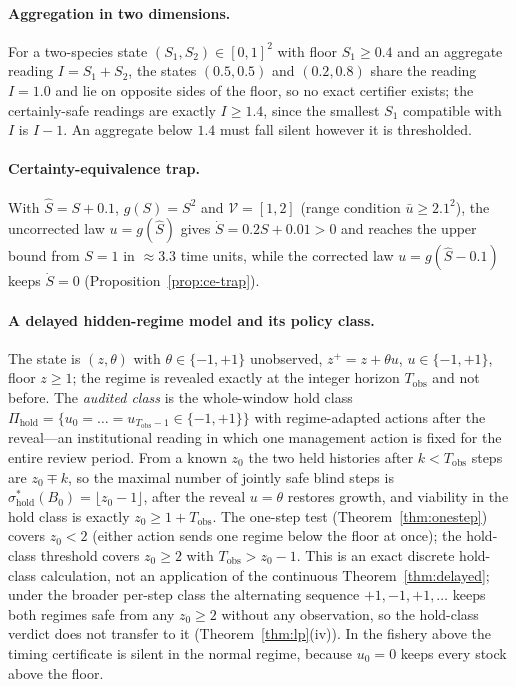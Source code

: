 \documentclass[11pt,a4paper]{article}
\theoremstyle{plain}
\theoremstyle{definition}
\theoremstyle{remark}
\newcommand{\cV}{\mathcal{V}}
\newcommand{\Tobs}{T_{\mathrm{obs}}}
\begin{document}
\paragraph{Aggregation in two dimensions.} For a two-species state $(S_1,S_2)\in[0,1]^2$ with floor $S_1\ge0.4$ and an aggregate reading $I=S_1+S_2$, the states $(0.5,0.5)$ and $(0.2,0.8)$ share the reading $I=1.0$ and lie on opposite sides of the floor, so no exact certifier exists; the certainly-safe readings are exactly $I\ge1.4$, since the smallest $S_1$ compatible with $I$ is $I-1$. An aggregate below $1.4$ must fall silent however it is thresholded.

\paragraph{Certainty-equivalence trap.} With $\hat S=S+0.1$, $g(S)=S^2$ and $\cV=[1,2]$ (range condition $\bar u\ge2.1^2$), the uncorrected law $u=g(\hat S)$ gives $\dot S=0.2S+0.01>0$ and reaches the upper bound from $S=1$ in $\approx3.3$ time units, while the corrected law $u=g(\hat S-0.1)$ keeps $\dot S=0$ (Proposition~\ref{prop:ce-trap}).

\paragraph{A delayed hidden-regime model and its policy class.} The state is $(z,\theta)$ with $\theta\in\{-1,+1\}$ unobserved, $z^+=z+\theta u$, $u\in\{-1,+1\}$, floor $z\ge1$; the regime is revealed exactly at the integer horizon $\Tobs$ and not before. The \emph{audited class} is the whole-window hold class $\Pi_{\mathrm{hold}}=\{u_0=\dots=u_{\Tobs-1}\in\{-1,+1\}\}$ with regime-adapted actions after the reveal---an institutional reading in which one management action is fixed for the entire review period. From a known $z_0$ the two held histories after $k<\Tobs$ steps are $z_0\mp k$, so the maximal number of jointly safe blind steps is $\sigma^*_{\mathrm{hold}}(B_0)=\lfloor z_0-1\rfloor$, after the reveal $u=\theta$ restores growth, and viability in the hold class is exactly $z_0\ge1+\Tobs$. The one-step test (Theorem~\ref{thm:onestep}) covers $z_0<2$ (either action sends one regime below the floor at once); the hold-class threshold covers $z_0\ge2$ with $\Tobs>z_0-1$. This is an exact discrete hold-class calculation, not an application of the continuous Theorem~\ref{thm:delayed}; under the broader per-step class the alternating sequence $+1,-1,+1,\dots$ keeps both regimes safe from any $z_0\ge2$ without any observation, so the hold-class verdict does not transfer to it (Theorem~\ref{thm:lp}(iv)). In the fishery above the timing certificate is silent in the normal regime, because $u_0=0$ keeps every stock above the floor.
\end{document}
